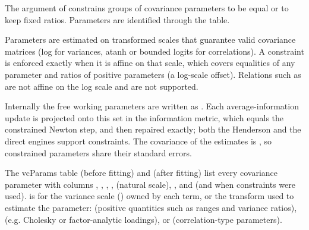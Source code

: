 \documentclass[a4paper]{book}
\begin{document}
%
\begin{Description}\relax
The  argument of  constrains groups of covariance
parameters to be equal or to keep fixed ratios.
Parameters are identified through the  table.
\end{Description}
%
\begin{Details}\relax
Parameters are estimated on transformed scales that guarantee valid
covariance matrices (log for variances, atanh or bounded logits for
correlations). A constraint is enforced exactly when it is affine on that
scale, which covers equalities of any parameter and ratios of positive
parameters (a log-scale offset). Relations such as
 are not affine on the log scale and are not supported.

Internally the free working parameters are written as . Each
average-information update is projected onto this set in the information
metric, which equals the constrained Newton step, and then repaired exactly;
both the Henderson and the direct engines support constraints. The covariance
of the estimates is , so constrained
parameters share their standard errors.
\end{Details}
%
\begin{Section}{The vcParams table}
(before fitting) and
 (after fitting) list every covariance parameter with
columns , , , ,
 (natural scale), ,  and 
(and  when constraints were used).  is 
for the variance scale () owned by each  term, or the
transform used to estimate the parameter:  (positive quantities
such as ranges and variance ratios),  (e.g. Cholesky or
factor-analytic loadings),  or 
(correlation-type parameters).
\end{Section}
%
\end{document}
